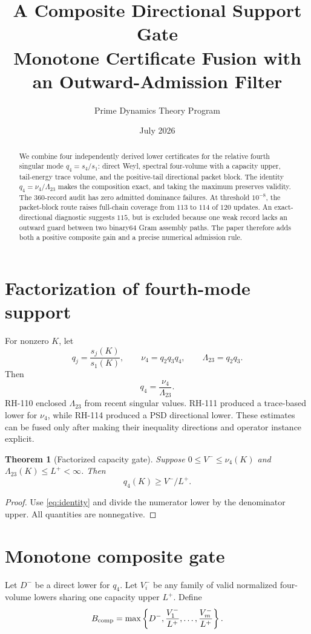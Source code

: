 \documentclass[12pt]{article}
\title{A Composite Directional Support Gate\\\large Monotone Certificate Fusion with an Outward-Admission Filter}
\author{Prime Dynamics Theory Program}\date{July 2026}
\newtheorem{theorem}{Theorem}\newtheorem{proposition}[theorem]{Proposition}\newtheorem{remark}[theorem]{Remark}
\begin{document}
\maketitle
\begin{abstract}
We combine four independently derived lower certificates for the relative
fourth singular mode $q_4=s_4/s_1$: direct Weyl, spectral four-volume with a
capacity upper, tail-energy trace volume, and the positive-tail directional
packet block.  The identity $q_4=\nu_4/\Lambda_{23}$ makes the composition
exact, and taking the maximum preserves validity.  The 360-record audit has
zero admitted dominance failures.  At threshold $10^{-8}$, the packet-block
route raises full-chain coverage from $113$ to $114$ of $120$ updates.  An
exact-directional diagnostic suggests $115$, but is excluded because one weak
record lacks an outward guard between two binary64 Gram assembly paths.  The
paper therefore adds both a positive composite gain and a precise numerical
admission rule.
\end{abstract}

\section{Factorization of fourth-mode support}
For nonzero $K$, let
\[
 q_j=\frac{s_j(K)}{s_1(K)},\qquad
 \nu_4=q_2q_3q_4,\qquad
 \Lambda_{23}=q_2q_3.
\]
Then
\begin{equation}\label{eq:identity}
 q_4=\frac{\nu_4}{\Lambda_{23}}.
\end{equation}
RH-110 enclosed $\Lambda_{23}$ from recent singular values.  RH-111 produced
a trace-based lower for $\nu_4$, while RH-114 produced a PSD directional
lower.  These estimates can be fused only after making their inequality
directions and operator instance explicit.

\begin{theorem}[Factorized capacity gate]\label{thm:factor}
Suppose $0\leq V^-\leq\nu_4(K)$ and
$\Lambda_{23}(K)\leq L^+<\infty$.  Then
\[
 q_4(K)\geq V^-/L^+.
\]
\end{theorem}
\begin{proof}
Use \eqref{eq:identity} and divide the numerator lower by the denominator
upper.  All quantities are nonnegative.
\end{proof}

\section{Monotone composite gate}
Let $D^-$ be a direct lower for $q_4$.  Let $V_i^-$ be any family of valid
normalized four-volume lowers sharing one capacity upper $L^+$.  Define
\begin{equation}\label{eq:composite}
 B_{\rm comp}=\max\left\{D^-,\frac{V_1^-}{L^+},\ldots,
 \frac{V_m^-}{L^+}\right\}.
\end{equation}
\end{document}
